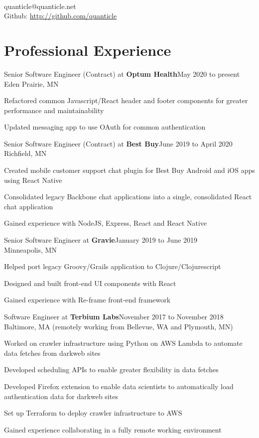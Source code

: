 \documentclass[letterpaper]{article}
\newenvironment{resume-list}
{\begin{itemize}
 \setlength{\itemsep}{0pt}
 \setlength{\parskip}{0pt}}
{\end{itemize}}
\begin{document}
\\
{\small quanticle@quanticle.net}\\
{\small Github: \url{http://github.com/quanticle}}\\
\section*{Professional Experience}
\noindent Senior Software Engineer (Contract) at {\bfseries Optum Health}\dotfill May 2020 to present\\
Eden Prairie, MN
\begin{resume-list}
\item Refactored common Javascript/React header and footer components for greater performance and maintainability
\item Updated messaging app to use OAuth for common authentication
\end{resume-list}
\noindent Senior Software Engineer (Contract) at {\bfseries Best Buy}\dotfill June 2019 to April 2020\\
Richfield, MN
\begin{resume-list}
\item Created mobile customer support chat plugin for Best Buy Android and iOS apps using React Native
\item Consolidated legacy Backbone chat applications into a single, consolidated React chat application
\item Gained experience with NodeJS, Express, React and React Native
\end{resume-list}
\noindent Senior Software Engineer at {\bfseries Gravie}\dotfill January 2019 to June 2019\\
Minneapolis, MN
\begin{resume-list}
\item Helped port legacy Groovy/Grails application to Clojure/Clojurescript
\item Designed and built front-end UI components with React
\item Gained experience with Re-frame front-end framework
\end{resume-list}
\noindent Software Engineer at {\bfseries Terbium Labs}\dotfill November 2017 to November 2018\\
Baltimore, MA (remotely working from Bellevue, WA and Plymouth, MN)
\begin{resume-list}
\item Worked on crawler infrastructure using Python on AWS Lambda to automate data fetches from darkweb sites
\item Developed scheduling APIs to enable greater flexibility in data fetches
\item Developed Firefox extension to enable data scientists to automatically load authentication data for darkweb sites
\item Set up Terraform to deploy crawler infrastructure to AWS
\item Gained experience collaborating in a fully remote working environment
\end{resume-list}
\end{document}
